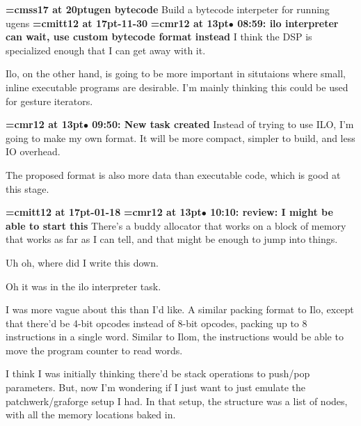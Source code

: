 {\medskip\noindent\bf\font\titlefont=cmss17 at 20pt\titlefont ugen bytecode}\medskip
Build a bytecode interpeter for running ugens
{\medskip\noindent\bf\font\titlefont=cmitt12 at 17pt-11-30}\medskip
{\smallskip\noindent\bf\font\titlefont=cmr12 at 13pt\titlefont $\bullet$ 08:59: ilo interpreter can wait, use custom bytecode format instead}\smallskip
I think the DSP is specialized enough that I can get away with it.
\par

Ilo, on the other hand, is going to be more important in situtaions where small, inline executable programs are desirable. I'm mainly thinking this could be used for  gesture iterators.
\par

{\smallskip\noindent\bf\font\titlefont=cmr12 at 13pt\titlefont $\bullet$ 09:50: New task created}\smallskip
Instead of trying to use ILO, I'm going to make my own format. It will be more compact, simpler to build, and less IO overhead.
\par

The proposed format is also more data than executable code, which is good at this stage.
\par

{\medskip\noindent\bf\font\titlefont=cmitt12 at 17pt-01-18}\medskip
{\smallskip\noindent\bf\font\titlefont=cmr12 at 13pt\titlefont $\bullet$ 10:10: review: I might be able to start this}\smallskip
There's a buddy allocator that works on a block of memory that works as far as I can tell, and that might be enough to jump into things.
\par

Uh oh, where did I write this down.
\par

Oh it was in the ilo interpreter task.
\par

I was more vague about this than I'd like. A similar packing format to Ilo, except that there'd be 4-bit opcodes instead of 8-bit opcodes, packing up to 8 instructions in a single word. Similar to Ilom, the instructions would be able to move the program counter to read words.
\par

I think I was initially thinking there'd be stack operations to push/pop parameters. But, now I'm wondering if I just want to just emulate the patchwerk/graforge setup I had. In that setup, the structure was a list of nodes, with all the memory locations baked in.
\par

